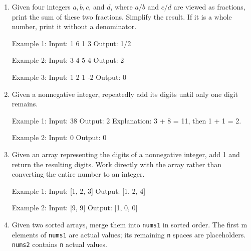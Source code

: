 \begin{enumerate}
\begin{consolethree}
Explanation: 1 2 9 means 1^3 + 2^3 = 9.
\end{consolethree}
\newpage



\item 
Given four integers $a, b, c$, and $d$, where $a / b$ and $c / d$
are viewed as fractions, print the sum of these two fractions.
Simplify the result.
If it is a whole number, print it without a denominator.

\begin{consolethree}
Example 1:
Input: 1 6 1 3
Output: 1/2

Example 2:
Input: 3 4 5 4
Output: 2

Example 3:
Input: 1 2 1 -2
Output: 0
\end{consolethree}
\newpage



\item
Given a nonnegative integer, repeatedly add its digits until only one digit remains.

\begin{consolethree}
Example 1:
Input: 38
Output: 2
Explanation: 3 + 8 = 11, then 1 + 1 = 2.

Example 2:
Input: 0
Output: 0
\end{consolethree}
\newpage



\item
Given an array representing the digits of a nonnegative integer, add 1 and return the resulting digits. Work directly with the array rather than converting the entire number to an integer.

\begin{consolethree}
Example 1:
Input: [1, 2, 3]
Output: [1, 2, 4]

Example 2:
Input: [9, 9]
Output: [1, 0, 0]
\end{consolethree}
\newpage



\item
Given two sorted arrays, merge them into \verb!nums1! in sorted order.
The first m elements of \verb!nums1! are actual values;
its remaining \verb!n! spaces are placeholders.
\verb!nums2! contains \verb!n! actual values.


\end{enumerate}
